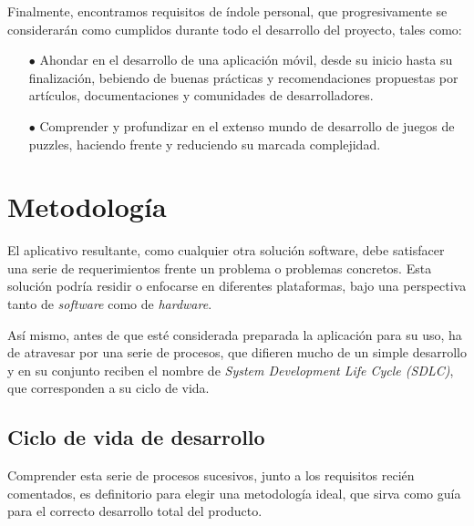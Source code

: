 Finalmente, encontramos requisitos de índole personal, que progresivamente se considerarán como cumplidos durante todo el desarrollo del proyecto,
tales como:

\begin{itemize}
   \item[$\bullet$] Ahondar en el desarrollo de una aplicación móvil, desde su inicio hasta su finalización,
   bebiendo de buenas prácticas y recomendaciones propuestas por artículos, documentaciones y comunidades de desarrolladores.
   \item[$\bullet$] Comprender y profundizar en el extenso mundo de desarrollo de juegos de puzzles, haciendo frente y reduciendo su
   marcada complejidad.
\end{itemize}

\section{Metodología}

El aplicativo resultante, como cualquier otra solución software, debe satisfacer una serie de requerimientos frente un problema
o problemas concretos. %
Esta solución podría residir o enfocarse en diferentes plataformas, bajo una perspectiva
tanto de \textit{software} como de \textit{hardware}.

Así mismo, antes de que esté considerada preparada la aplicación para su uso, ha de atravesar por una serie de procesos,
que difieren mucho de un simple desarrollo y en su conjunto reciben el nombre de \textit{System Development Life Cycle (SDLC)},
que corresponden a su ciclo de vida.

\subsection{Ciclo de vida de desarrollo}
Comprender esta serie de procesos sucesivos, junto a los requisitos recién comentados, es definitorio para elegir una metodología ideal,
que sirva como guía para el correcto desarrollo total del producto.

